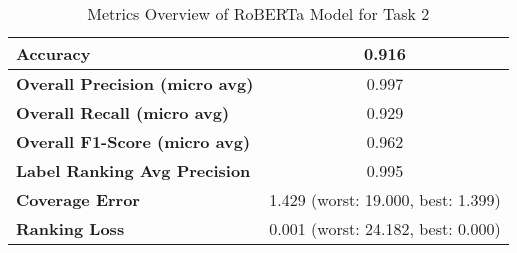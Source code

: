 \begin{table}[h]
\begin{tabular}{|l|c|c|c|c|}
\textbf{Accuracy}                    & \multicolumn{4}{c|}{0.916}                                 \\ \hline
\textbf{Overall Precision (micro avg)}           & \multicolumn{4}{c|}{0.997}                                \\ \hline
\textbf{Overall Recall (micro avg)}              & \multicolumn{4}{c|}{0.929}                                   \\ \hline
\textbf{Overall F1-Score (micro avg)}            & \multicolumn{4}{c|}{0.962}                                  \\ \hline
\textbf{Label Ranking Avg Precision} & \multicolumn{4}{c|}{0.995}                                    \\ \hline
\textbf{Coverage Error}              & \multicolumn{4}{c|}{1.429 (worst: 19.000, best: 1.399)}                             \\ \hline
\textbf{Ranking Loss}                & \multicolumn{4}{c|}{0.001 (worst: 24.182, best: 0.000)}                             \\ \hline
\end{tabular}

\caption{Metrics Overview of RoBERTa Model for Task 2}
\label{table:roberta_metrics_task_01}
\end{table}
    